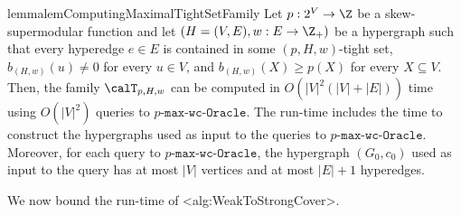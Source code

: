 \documentclass{article}
\def\Cref#1{<#1>}%
\newcommand{\functionMaximizationOracle}[1]{\ensuremath{{#1}\text{-}\mathtt{max}\text{-}\mathtt{wc}\text{-}\mathtt{Oracle}}\xspace}
\newcommand{\maximalTightSetFamily}[1]{\ensuremath{\calT_{#1}}\xspace}
\begin{document}
\begin{restatable}{lemma}{lemComputingMaximalTightSetFamily}\label{lem:FunctionMaximizetionOracles:computing-maximal-pHw-tight-sets-with-p-max-oracle}
 Let $p:2^V\rightarrow\Z$ be a skew-supermodular function and let $\left(H = (V, E), w:E \rightarrow\Z_+\right)$ be a hypergraph such that every hyperedge $e \in E$ is contained in some $(p, H, w)$-tight set, $b_{(H,w)}(u) \not = 0$ for every $u \in V$, and $b_{(H,w)}(X) \geq p(X)$ for every $X \subseteq V$.
Then, the family $\maximalTightSetFamily{p, H, w}$ can be computed in $O(|V|^2(|V|+|E|))$ time using $O(|V|^2)$ queries to \functionMaximizationOracle{p}. The run-time includes the time to construct the hypergraphs used as input to the queries to \functionMaximizationOracle{p}. Moreover, for each query to \functionMaximizationOracle{p}, the hypergraph $(G_0, c_0)$ used as input to the query has at most $|V|$ vertices and at most $|E| + 1$ hyperedges.  \end{restatable}

We now bound the run-time of \Cref{alg:WeakToStrongCover}. 
\end{document}
